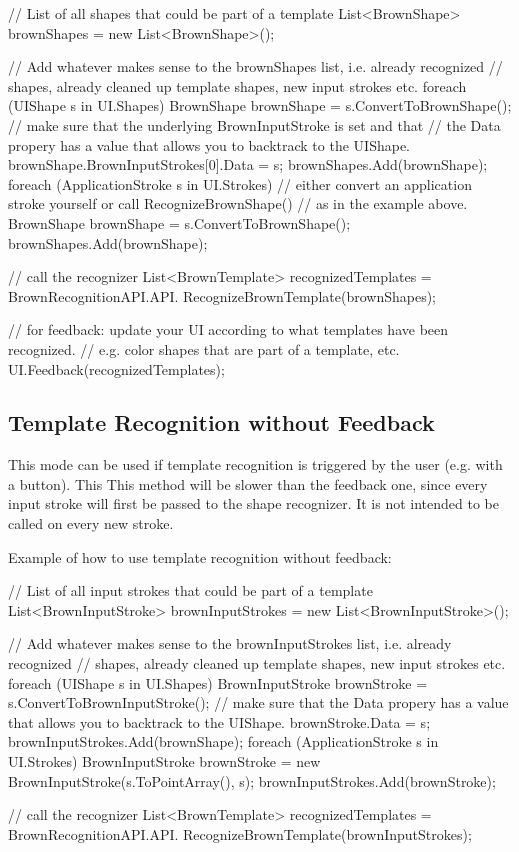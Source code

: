\begin{DoxyCode}
 // List of all shapes that could be part of a template
 List<BrownShape> brownShapes = new List<BrownShape>();
 
 // Add whatever makes sense to the brownShapes list, i.e. already recognized
 // shapes, already cleaned up template shapes, new input strokes etc. 
 foreach (UIShape s in UI.Shapes) {
     BrownShape brownShape = s.ConvertToBrownShape();
     // make sure that the underlying BrownInputStroke is set and that 
     // the Data propery has a value that allows you to backtrack to the
       UIShape. 
     brownShape.BrownInputStrokes[0].Data = s;
     brownShapes.Add(brownShape);
 }
 foreach (ApplicationStroke s in UI.Strokes) {
     // either convert an application stroke yourself or call
       RecognizeBrownShape()
     // as in the example above.
     BrownShape brownShape = s.ConvertToBrownShape();
     brownShapes.Add(brownShape);
 }
 
 // call the recognizer
 List<BrownTemplate> recognizedTemplates = BrownRecognitionAPI.API.
      RecognizeBrownTemplate(brownShapes);
 
 // for feedback: update your UI according to what templates have been
       recognized.
 // e.g. color shapes that are part of a template, etc. 
 UI.Feedback(recognizedTemplates);
\end{DoxyCode}
\hypertarget{index_ac}{}\subsection{\-Template Recognition without Feedback}\label{index_ac}
\-This mode can be used if template recognition is triggered by the user (e.\-g. with a button). \-This \-This method will be slower than the feedback one, since every input stroke will first be passed to the shape recognizer. \-It is not intended to be called on every new stroke. \par
 \par
 \-Example of how to use template recognition without feedback\-: 
\begin{DoxyCode}
 // List of all input strokes that could be part of a template
 List<BrownInputStroke> brownInputStrokes = new List<BrownInputStroke>();
 
 // Add whatever makes sense to the brownInputStrokes list, i.e. already
       recognized
 // shapes, already cleaned up template shapes, new input strokes etc. 
 foreach (UIShape s in UI.Shapes) {
     BrownInputStroke brownStroke = s.ConvertToBrownInputStroke();
     // make sure that the Data propery has a value that allows you to
       backtrack to the UIShape. 
     brownStroke.Data = s;
     brownInputStrokes.Add(brownShape);
 }
 foreach (ApplicationStroke s in UI.Strokes) {
     BrownInputStroke brownStroke = new BrownInputStroke(s.ToPointArray(), s);
     brownInputStrokes.Add(brownStroke);
 }
 
 // call the recognizer
 List<BrownTemplate> recognizedTemplates = BrownRecognitionAPI.API.
      RecognizeBrownTemplate(brownInputStrokes);
\end{DoxyCode}
